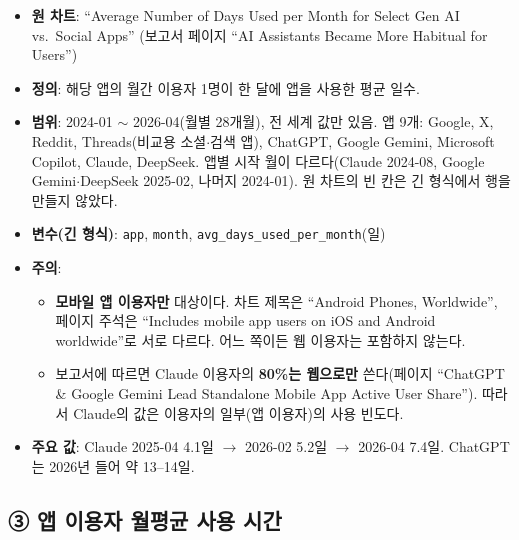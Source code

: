 \documentclass[11pt]{article}
\begin{document}
\begin{itemize}
  \item \textbf{원 차트}: ``Average Number of Days Used per Month for Select Gen AI vs.\ Social Apps'' (보고서 페이지 ``AI Assistants Became More Habitual for Users'')
  \item \textbf{정의}: 해당 앱의 월간 이용자 1명이 한 달에 앱을 사용한 평균 일수.
  \item \textbf{범위}: 2024-01 $\sim$ 2026-04(월별 28개월), 전 세계 값만 있음. 앱 9개: Google, X, Reddit, Threads(비교용 소셜$\cdot$검색 앱), ChatGPT, Google Gemini, Microsoft Copilot, Claude, DeepSeek. 앱별 시작 월이 다르다(Claude 2024-08, Google Gemini$\cdot$DeepSeek 2025-02, 나머지 2024-01). 원 차트의 빈 칸은 긴 형식에서 행을 만들지 않았다.
  \item \textbf{변수(긴 형식)}: \texttt{app}, \texttt{month}, \texttt{avg\_days\_used\_per\_month}(일)
  \item \textbf{주의}:
  \begin{itemize}
    \item \textbf{모바일 앱 이용자만} 대상이다. 차트 제목은 ``Android Phones, Worldwide'', 페이지 주석은 ``Includes mobile app users on iOS and Android worldwide''로 서로 다르다. 어느 쪽이든 웹 이용자는 포함하지 않는다.
    \item 보고서에 따르면 Claude 이용자의 \textbf{80\%는 웹으로만} 쓴다(페이지 ``ChatGPT \& Google Gemini Lead Standalone Mobile App Active User Share''). 따라서 Claude의 값은 이용자의 일부(앱 이용자)의 사용 빈도다.
  \end{itemize}
  \item \textbf{주요 값}: Claude 2025-04 4.1일 $\to$ 2026-02 5.2일 $\to$ 2026-04 7.4일. ChatGPT는 2026년 들어 약 13--14일.
\end{itemize}

\subsection{③ 앱 이용자 월평균 사용 시간}
\end{document}
